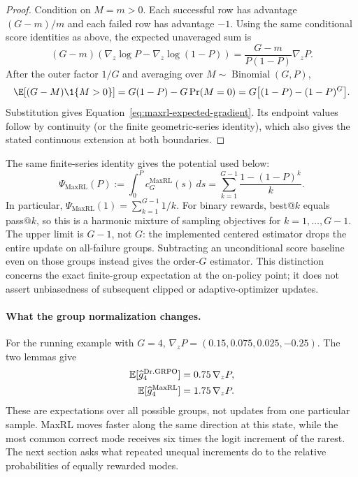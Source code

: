 \begin{proof}
Condition on $M=m>0$. Each successful row has advantage $(G-m)/m$ and each
failed row has advantage $-1$. Using the same conditional score identities as
above, the expected unaveraged sum is
\[
  (G-m)\!\left(\nabla_z\log P-\nabla_z\log(1-P)\right)
  =\frac{G-m}{P(1-P)}\nabla_zP.
\]
After the outer factor $1/G$ and averaging over
$M\sim\operatorname{Binomial}(G,P)$,
\[
 \E[(G-M)\1\{M>0\}]
 =G(1-P)-G\Pr(M=0)
 =G\big[(1-P)-(1-P)^G\big].
\]
Substitution gives Equation~\eqref{eq:maxrl-expected-gradient}. Its endpoint
values follow by continuity (or the finite geometric-series identity), which
also gives the stated continuous extension at both boundaries.
\end{proof}

The same finite-series identity gives the potential used below:
\begin{equation}
 \Psi_{\mathrm{MaxRL}}(P)
 :=\int_0^P c_G^{\mathrm{MaxRL}}(s)\,ds
 =\sum_{k=1}^{G-1}\frac{1-(1-P)^k}{k}.
 \label{eq:maxrl-potential-finite-sum}
\end{equation}
In particular, $\Psi_{\mathrm{MaxRL}}(1)=\sum_{k=1}^{G-1}1/k$.
For binary rewards, best@\(k\) equals pass@\(k\), so this is a harmonic
mixture of sampling objectives for $k=1,\ldots,G-1$. The upper limit is
$G-1$, not $G$: the implemented centered estimator drops the entire update
on all-failure groups. Subtracting an unconditional score baseline even on
those groups instead gives the order-$G$ estimator. This distinction concerns
the exact finite-group expectation at the on-policy point; it does not assert
unbiasedness of subsequent clipped or adaptive-optimizer updates.

\paragraph{What the group normalization changes.}
For the running example with $G=4$,
$\nabla_zP=(0.15,0.075,0.025,-0.25)$. The two lemmas give
\[
 \begin{aligned}
 \mathbb E[\widehat g_4^{\rm Dr.GRPO}]&=0.75\,\nabla_zP,\\
 \mathbb E[\widehat g_4^{\rm MaxRL}]&=1.75\,\nabla_zP.
 \end{aligned}
\]
These are expectations over all possible groups, not updates from one
particular sample. MaxRL moves faster along the same direction at this
state, while the most common correct mode receives six times the logit
increment of the rarest. The next section asks what repeated unequal
increments do to the relative probabilities of equally rewarded modes.

